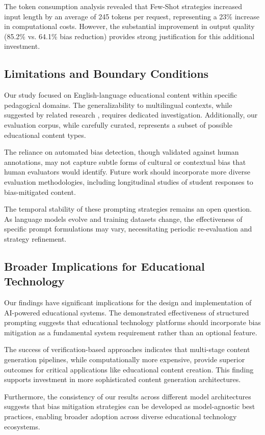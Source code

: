 The token consumption analysis revealed that Few-Shot strategies increased input length by an average of 245 tokens per request, representing a 23\% increase in computational costs. However, the substantial improvement in output quality (85.2\% vs. 64.1\% bias reduction) provides strong justification for this additional investment.

\subsection{Limitations and Boundary Conditions}

Our study focused on English-language educational content within specific pedagogical domains. The generalizability to multilingual contexts, while suggested by related research \cite{zhao2024multilangbias}, requires dedicated investigation. Additionally, our evaluation corpus, while carefully curated, represents a subset of possible educational content types.

The reliance on automated bias detection, though validated against human annotations, may not capture subtle forms of cultural or contextual bias that human evaluators would identify. Future work should incorporate more diverse evaluation methodologies, including longitudinal studies of student responses to bias-mitigated content.

The temporal stability of these prompting strategies remains an open question. As language models evolve and training datasets change, the effectiveness of specific prompt formulations may vary, necessitating periodic re-evaluation and strategy refinement.

\subsection{Broader Implications for Educational Technology}

Our findings have significant implications for the design and implementation of AI-powered educational systems. The demonstrated effectiveness of structured prompting suggests that educational technology platforms should incorporate bias mitigation as a fundamental system requirement rather than an optional feature.

The success of verification-based approaches indicates that multi-stage content generation pipelines, while computationally more expensive, provide superior outcomes for critical applications like educational content creation. This finding supports investment in more sophisticated content generation architectures.

Furthermore, the consistency of our results across different model architectures suggests that bias mitigation strategies can be developed as model-agnostic best practices, enabling broader adoption across diverse educational technology ecosystems.